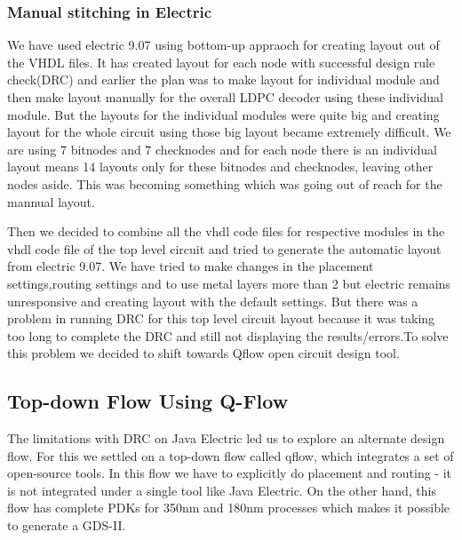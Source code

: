 \documentclass[11pt, a4paper]{article}
\begin{document}
\subsubsection{Manual stitching in Electric}
We have used electric 9.07 using bottom-up appraoch for creating layout out of
the VHDL files. It has created layout for each node with successful design
rule check(DRC) and earlier the plan was to make layout for individual module
and then make layout manually for the overall LDPC decoder using these
individual module. But the layouts for the individual modules were quite big
and creating layout for the whole circuit using those big layout became
extremely difficult. We are using 7 bitnodes and 7 checknodes and for
each node there is an individual layout means 14 layouts only for these
bitnodes and checknodes, leaving other nodes aside. This was becoming
something which was going out of reach for the mannual layout.

Then we decided to combine all the vhdl code files for respective modules in
the vhdl code file of the top level circuit and tried to generate the
automatic layout from electric 9.07. We have tried to make changes in the
placement settings,routing settings and to use metal layers more than 2 but
electric remains unresponsive and creating layout with the default settings.
But there was a problem in running DRC for this top level circuit layout
because it was taking too long to complete the DRC and still not displaying
the results/errors.To solve this problem we decided to shift towards Qflow
open circuit design tool.

\subsection{Top-down Flow Using Q-Flow}
The limitations with DRC on Java Electric led us to explore an alternate
design flow. For this we settled on a top-down flow called qflow, which
integrates a set of open-source tools. In this flow we have to explicitly do
placement and routing - it is not integrated under a single tool like Java
Electric. On the other hand, this flow has complete PDKs for 350nm and 180nm
processes which makes it possible to generate a GDS-II.
\end{document}
